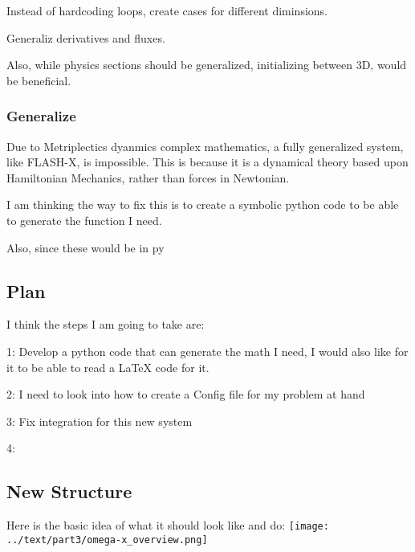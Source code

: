 Instead of hardcoding loops, create cases for different diminsions.


Generaliz derivatives and fluxes.

Also, while physics sections should be generalized, initializing between 3D, would be beneficial.
\subsubsection{Generalize}
Due to Metriplectics dyanmics complex mathematics, a fully generalized system, like FLASH-X, is impossible. This is because it is a dynamical theory based upon Hamiltonian Mechanics, rather than forces in Newtonian.

I am thinking the way to fix this is to create a symbolic python code to be able to generate the function I need.

Also, since these would be in py
\subsection{Plan}

I think the steps I am going to take are:

1: Develop a python code that can generate the math I need, I would also like for it to be able to read a LaTeX code for it.

2: I need to look into how to create a Config file for my problem at hand

3: Fix integration for this new system

4: 
\subsection{New Structure}
Here is the basic idea of what it should look like and do:
\texttt{[image: ../text/part3/omega-x\_overview.png]}

